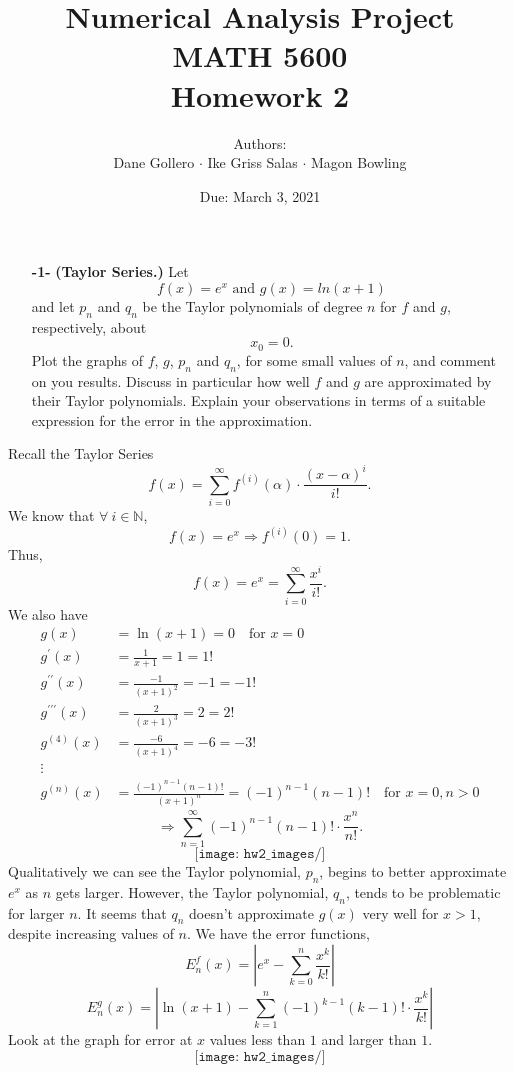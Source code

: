 \documentclass[11pt]{article}
\theoremstyle{definition}
\newcommand{\1}[1]{\mathbf{1} \left \{ #1 \right \}}
\begin{document}
\title{Numerical Analysis Project \\ MATH 5600 \\ Homework 2}
\date{Due: March 3, 2021}
\author{Authors: \\ Dane Gollero $\cdot$ Ike Griss Salas $\cdot$ Magon Bowling}

\maketitle

\begin{itemize}
    \item[{\textbf{-1-}}] \textbf{(Taylor Series.)}  Let
    \begin{equation}
        f(x)=e^x \text{ and } g(x)=ln(x+1)
    \end{equation}
    and let $p_n$ and $q_n$ be the Taylor polynomials of degree $n$ for $f$ and $g$, respectively, about
    \begin{equation}
        x_0 = 0.
    \end{equation}
    Plot the graphs of $f$, $g$, $p_n$ and $q_n$, for some small values of $n$, and comment on you results.  Discuss in particular how well $f$ and $g$ are approximated by their Taylor polynomials.  Explain your observations in terms of a suitable expression for the error in the approximation.
\end{itemize}
Recall the Taylor Series
\[f(x) = \sum_{i=0}^{\infty} f^{(i)} (\alpha) \cdot \frac{(x-\alpha)^i}{i!}.\]
We know that \(\forall \ i \in \mathbb{N}\),
\[f(x) = e^x \Rightarrow f^{(i)}(0) = 1.\]
Thus,
\[f(x) = e^x = \sum_{i=0}^{\infty} \frac{x^i}{i!}.\]
We also have
\begin{equation*}
    \begin{split}
        g(x) &= \ln (x+1) = 0 \quad \text{for } x = 0 \\
        g^{\prime}(x) &= \frac{1}{x+1} = 1 = 1! \\
        g^{\prime\prime}(x) &= \frac{-1}{(x+1)^2} = -1 = -1! \\
        g^{\prime\prime\prime}(x) &= \frac{2}{(x+1)^3} = 2 = 2! \\
        g^{(4)}(x) &= \frac{-6}{(x+1)^4} = -6 = -3! \\
        \vdots \\
        g^{(n)} (x) &= \frac{(-1)^{n-1} (n-1)!}{(x+1)^n} = (-1)^{n-1} (n-1)! \quad \text{for } x=0, n>0
    \end{split}
\end{equation*}
\[\Longrightarrow \sum_{n=1}^{\infty} (-1)^{n-1} (n-1)! \cdot \frac{x^n}{n!}.\]
\[\texttt{[image: hw2\_images/]}\]
Qualitatively we can see the Taylor polynomial, $p_n$, begins to better approximate $e^x$ as $n$ gets larger.  However, the Taylor polynomial, $q_n$, tends to be problematic for larger $n$.  It seems that $q_n$ doesn't approximate $g(x)$ very well for $x>1$, despite increasing values of $n$.
We have the error functions,
\[E_n^f (x) = \left|e^x - \sum_{k=0}^n \frac{x^k}{k!}\right|\]
\[E_n^g (x) = \left|\ln (x+1) - \sum_{k=1}^n (-1)^{k-1} (k-1)! \cdot \frac{x^k}{k!}\right|\]
Look at the graph for error at $x$ values less than $1$ and larger than $1$.
\[\texttt{[image: hw2\_images/]}\]
\end{document}
